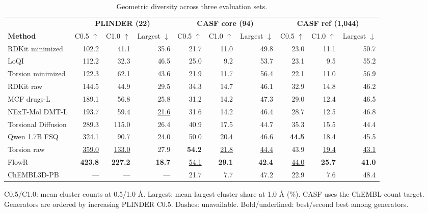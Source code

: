 \begin{table}[htbp]
\centering\footnotesize
\setlength{\tabcolsep}{2pt}
\renewcommand{\arraystretch}{1.35}
\caption{Geometric diversity across three evaluation sets.}
\label{tab:diversity}
\par\smallskip
\begin{tabular*}{\linewidth}{@{\extracolsep{\fill}}lrrr@{\hspace{8pt}}rrr@{\hspace{8pt}}rrr@{}}
\toprule
 & \multicolumn{3}{c}{\textcolor{plinderTeal}{\textbf{PLINDER (22)}}} & \multicolumn{3}{c}{\textbf{CASF core (94)}} & \multicolumn{3}{c}{\textbf{CASF ref (1,044)}} \\
\cmidrule(lr){2-4}\cmidrule(lr){5-7}\cmidrule(l){8-10}
\textbf{Method} & C0.5 $\uparrow$ & C1.0 $\uparrow$ & Largest $\downarrow$ & C0.5 $\uparrow$ & C1.0 $\uparrow$ & Largest $\downarrow$ & C0.5 $\uparrow$ & C1.0 $\uparrow$ & Largest $\downarrow$ \\
\midrule
\rowcolor{tableShade}
RDKit minimized & 102.2 & 41.1 & 35.6 & 21.7 & 11.0 & 49.8 & 23.0 & 11.1 & 50.7 \\
LoQI & 112.2 & 32.3 & 46.5 & 25.0 & 9.2 & 53.7 & 23.1 & 9.5 & 55.2 \\
\rowcolor{tableShade}
Torsion minimized & 122.3 & 62.1 & 43.6 & 21.9 & 11.7 & 56.4 & 22.1 & 11.0 & 56.9 \\
RDKit raw & 144.5 & 44.9 & 29.5 & 34.3 & 14.7 & 46.1 & 32.9 & 14.8 & 46.2 \\
\rowcolor{tableShade}
MCF drugs-L & 189.1 & 56.8 & 25.8 & 31.2 & 14.2 & 47.3 & 29.0 & 12.4 & 46.5 \\
NExT-Mol DMT-L & 193.7 & 59.4 & \underline{21.6} & 31.6 & 14.2 & 46.4 & 28.7 & 12.5 & 46.8 \\
\rowcolor{tableShade}
Torsional Diffusion & 289.3 & 115.0 & 26.4 & 40.9 & 17.5 & 44.7 & 35.3 & 15.5 & 44.4 \\
Qwen 1.7B FSQ & 324.1 & 90.7 & 24.0 & 50.0 & 20.4 & 46.6 & \textbf{44.5} & 18.4 & 45.5 \\
\rowcolor{tableShade}
Torsion raw & \underline{359.0} & \underline{133.0} & 27.9 & \textbf{54.2} & \underline{21.8} & \underline{44.4} & 43.9 & \underline{19.4} & \underline{43.1} \\
FlowR & \textbf{423.8} & \textbf{227.2} & \textbf{18.7} & \underline{54.1} & \textbf{29.1} & \textbf{42.4} & \underline{44.0} & \textbf{25.7} & \textbf{41.0} \\
\hdashline
ChEMBL3D-PB & --- & --- & --- & 21.7 & 7.7 & 47.2 & 22.9 & 7.6 & 48.4 \\
\bottomrule
\end{tabular*}
\par\smallskip
\begin{minipage}{\linewidth}
C0.5/C1.0: mean cluster counts at 0.5/1.0 \AA{}. Largest: mean largest-cluster share at 1.0 \AA{} (\%). CASF uses the ChEMBL-count target. Generators are ordered by increasing PLINDER C0.5. Dashes: unavailable. Bold/underlined: best/second best among generators.
\end{minipage}
\end{table}
